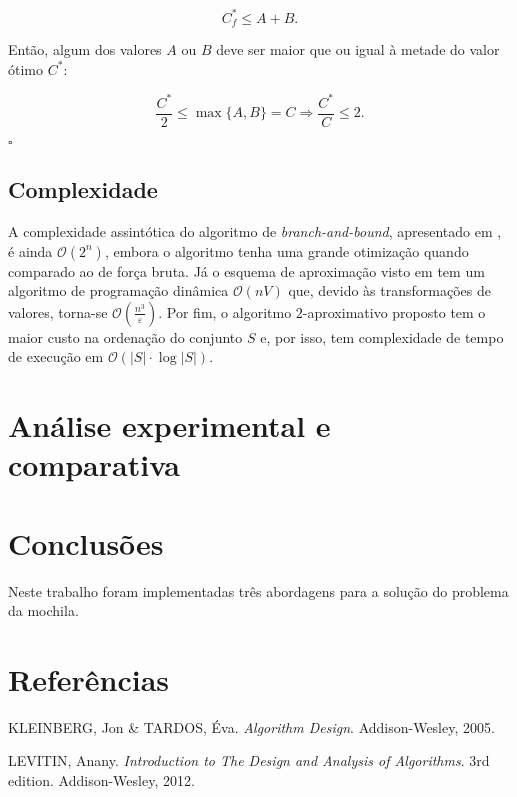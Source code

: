 \documentclass[12pt]{article}
\begin{document}
\[C_f^* \leq A + B.\]

Então, algum dos valores \(A\) ou \(B\) deve ser maior que ou igual à metade do valor ótimo \(C^*\):

\[\frac{C^*}{2} \leq \max\{A, B\} = C \Rightarrow \frac{C^*}{C} \leq 2.\]

\begin{flushright}
\(\square\)
\end{flushright}

\subsection{Complexidade}

A complexidade assintótica do algoritmo de \textit{branch-and-bound}, apresentado em \cite{levitin}, é ainda \(\mathcal{O}(2^n)\), embora o algoritmo tenha uma grande otimização quando comparado ao de força bruta. Já o esquema de aproximação visto em \cite{kt} tem um algoritmo de programação dinâmica \(\mathcal{O}(nV)\) que, devido às transformações de valores, torna-se \(\mathcal{O}\left(\frac{n^3}{\varepsilon}\right)\). Por fim, o algoritmo \(2\)-aproximativo proposto tem o maior custo na ordenação do conjunto \(S\) e, por isso, tem complexidade de tempo de execução em \(\mathcal{O}(|S| \cdot \log |S|)\).


\section{Análise experimental e comparativa}

\section{Conclusões}

Neste trabalho foram implementadas três abordagens para a solução do problema da mochila.

\section{Referências}

\begin{thebibliography}{1}

 KLEINBERG, Jon \& TARDOS, Éva. \textit{Algorithm Design}. Addison-Wesley, 2005.

LEVITIN, Anany. \textit{Introduction to The Design and Analysis of Algorithms}. 3rd edition. Addison-Wesley, 2012.


\end{thebibliography}
\end{document}
